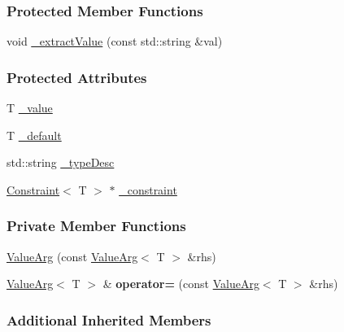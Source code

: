 \subsubsection*{Protected Member Functions}
\begin{DoxyCompactItemize}
\item 
void \hyperlink{classTCLAP_1_1ValueArg_af0ecdb6537febfcaa322e7131d2b3bf8}{\+\_\+extract\+Value} (const std\+::string \&val)
\end{DoxyCompactItemize}
\subsubsection*{Protected Attributes}
\begin{DoxyCompactItemize}
\item 
T \hyperlink{classTCLAP_1_1ValueArg_a45d5fdfce5865c02e6663f7438d485c7}{\+\_\+value}
\item 
T \hyperlink{classTCLAP_1_1ValueArg_a118e3a7932700a8e3626d8f9ee2e0c95}{\+\_\+default}
\item 
std\+::string \hyperlink{classTCLAP_1_1ValueArg_a78c5e5b67ce4bcebb57c886d9aa49259}{\+\_\+type\+Desc}
\item 
\hyperlink{classTCLAP_1_1Constraint}{Constraint}$<$ T $>$ $\ast$ \hyperlink{classTCLAP_1_1ValueArg_aa383908cff37688cf7493d46c840d03b}{\+\_\+constraint}
\end{DoxyCompactItemize}
\subsubsection*{Private Member Functions}
\begin{DoxyCompactItemize}
\item 
\hyperlink{classTCLAP_1_1ValueArg_a22a2eb14d853d3480a7b40469e9bc38e}{Value\+Arg} (const \hyperlink{classTCLAP_1_1ValueArg}{Value\+Arg}$<$ T $>$ \&rhs)
\item 
\hyperlink{classTCLAP_1_1ValueArg}{Value\+Arg}$<$ T $>$ \& {\bfseries operator=} (const \hyperlink{classTCLAP_1_1ValueArg}{Value\+Arg}$<$ T $>$ \&rhs)\hypertarget{classTCLAP_1_1ValueArg_a0cab7159c04499b813647ef7dfd1eca5}{}\label{classTCLAP_1_1ValueArg_a0cab7159c04499b813647ef7dfd1eca5}

\end{DoxyCompactItemize}
\subsubsection*{Additional Inherited Members}



